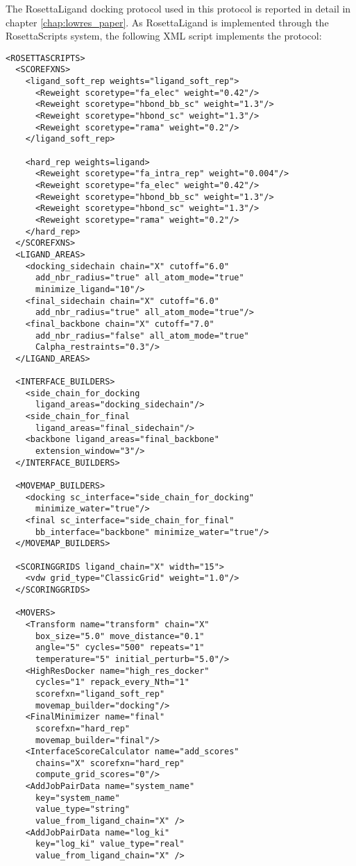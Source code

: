 The RosettaLigand docking protocol used in this protocol is reported in detail in chapter \ref{chap:lowres_paper}.
As RosettaLigand is implemented through the RosettaScripts system, the following XML script implements the protocol:
\singlespace
\begin{verbatim}
<ROSETTASCRIPTS>
  <SCOREFXNS>
    <ligand_soft_rep weights="ligand_soft_rep">
      <Reweight scoretype="fa_elec" weight="0.42"/>
      <Reweight scoretype="hbond_bb_sc" weight="1.3"/>
      <Reweight scoretype="hbond_sc" weight="1.3"/>
      <Reweight scoretype="rama" weight="0.2"/>
    </ligand_soft_rep>
  
    <hard_rep weights=ligand>
      <Reweight scoretype="fa_intra_rep" weight="0.004"/>
      <Reweight scoretype="fa_elec" weight="0.42"/>
      <Reweight scoretype="hbond_bb_sc" weight="1.3"/>
      <Reweight scoretype="hbond_sc" weight="1.3"/>
      <Reweight scoretype="rama" weight="0.2"/>
    </hard_rep>
  </SCOREFXNS>
  <LIGAND_AREAS>
    <docking_sidechain chain="X" cutoff="6.0"
      add_nbr_radius="true" all_atom_mode="true"
      minimize_ligand="10"/>
    <final_sidechain chain="X" cutoff="6.0" 
      add_nbr_radius="true" all_atom_mode="true"/>
    <final_backbone chain="X" cutoff="7.0" 
      add_nbr_radius="false" all_atom_mode="true"
      Calpha_restraints="0.3"/>
  </LIGAND_AREAS>
  
  <INTERFACE_BUILDERS>
    <side_chain_for_docking
      ligand_areas="docking_sidechain"/>
    <side_chain_for_final
      ligand_areas="final_sidechain"/>
    <backbone ligand_areas="final_backbone"
      extension_window="3"/>
  </INTERFACE_BUILDERS>
  
  <MOVEMAP_BUILDERS>
    <docking sc_interface="side_chain_for_docking"
      minimize_water="true"/>
    <final sc_interface="side_chain_for_final"
      bb_interface="backbone" minimize_water="true"/>
  </MOVEMAP_BUILDERS>
  
  <SCORINGGRIDS ligand_chain="X" width="15">
    <vdw grid_type="ClassicGrid" weight="1.0"/>
  </SCORINGGRIDS>
  
  <MOVERS>
    <Transform name="transform" chain="X"
      box_size="5.0" move_distance="0.1"
      angle="5" cycles="500" repeats="1"
      temperature="5" initial_perturb="5.0"/>
    <HighResDocker name="high_res_docker"
      cycles="1" repack_every_Nth="1"
      scorefxn="ligand_soft_rep"
      movemap_builder="docking"/>
    <FinalMinimizer name="final"
      scorefxn="hard_rep" 
      movemap_builder="final"/>
    <InterfaceScoreCalculator name="add_scores"
      chains="X" scorefxn="hard_rep" 
      compute_grid_scores="0"/>
    <AddJobPairData name="system_name"
      key="system_name"
      value_type="string"
      value_from_ligand_chain="X" />
    <AddJobPairData name="log_ki"
      key="log_ki" value_type="real"
      value_from_ligand_chain="X" />
    

\end{verbatim}
